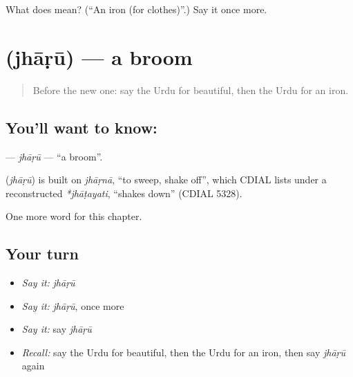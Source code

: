 \begin{tcolorbox}[breakable,colback=teal!4,colframe=teal!35!black,title={Before you move on}]
What does  mean? (\textquotedblleft{}An iron (for clothes)\textquotedblright{}.) Say it once more.
\end{tcolorbox}
\section[\texorpdfstring{\ur{جھاڑو} (jhāṛū)}{جھاڑو (jhāṛū)}]{ (jhāṛū) — a broom}

\label{lesson:UR-C224-jharu}



\begin{quote}
Before the new one: say the Urdu for beautiful, then the Urdu for an iron.
\end{quote}

\subsection*{You'll want to know: }
\textbf{} — \emph{jhāṛū} — \textquotedblleft{}a broom\textquotedblright{}.

\begin{cousinweb}
\textbf{} (\emph{jhāṛū}) is built on \emph{jhāṛnā}, \textquotedblleft{}to sweep, shake off\textquotedblright{}, which CDIAL lists under a reconstructed \emph{*jhāṭayati}, \textquotedblleft{}shakes down\textquotedblright{} (CDIAL 5328).
\end{cousinweb}

\begin{grammarlens}[title={What you've built}]
One more word for this chapter.
\end{grammarlens}

\subsection*{Your turn}
\begin{itemize}
\raggedright
  \item \emph{Say it:} \emph{jhāṛū}
  \item \emph{Say it:} \emph{jhāṛū}, once more
  \item \emph{Say it:} say \emph{jhāṛū}
  \item \emph{Recall:} say the Urdu for beautiful, then the Urdu for an iron, then say \emph{jhāṛū} again
\end{itemize}

